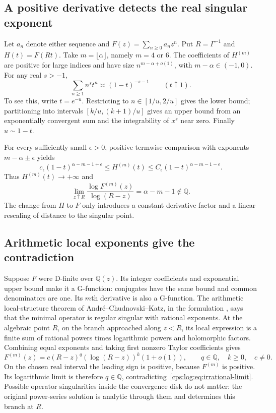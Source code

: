 \documentclass[11pt,letterpaper]{article}
\numberwithin{equation}{section}
\theoremstyle{remark}\newtheorem{remark}[theorem]{Remark}
\begin{document}
\subsection{A positive derivative detects the real singular exponent}
Let $a_n$ denote either sequence and
$F(z)=\sum_{n\ge0}a_nz^n$. Put $R=\Gamma^{-1}$ and $H(t)=F(Rt)$.
Take $m=\lfloor\alpha\rfloor$, namely $m=4$ or $6$. The coefficients
of $H^{(m)}$ are positive for large indices and have size
$n^{m-\alpha+o(1)}$, with $m-\alpha\in(-1,0)$.
For any real $s>-1$,
\begin{equation}\label{cps:log:eq:powersum}
 \sum_{n\ge1}n^st^n\asymp(1-t)^{-s-1}\qquad(t\uparrow1).
\end{equation}
To see this, write $t=e^{-u}$. Restricting to
$n\in[1/u,2/u]$ gives the lower bound; partitioning into intervals
$[k/u,(k+1)/u]$ gives an upper bound from an exponentially convergent
sum and the integrability of $x^s$ near zero. Finally $u\sim1-t$.

For every sufficiently small $\epsilon>0$, positive termwise
comparison with exponents $m-\alpha\pm\epsilon$ yields
\[
 c_\epsilon(1-t)^{\alpha-m-1+\epsilon}
 \le H^{(m)}(t)
 \le C_\epsilon(1-t)^{\alpha-m-1-\epsilon}.
\]
Thus $H^{(m)}(t)\to+\infty$ and
\begin{equation}\label{cps:log:eq:irrational-limit}
 \lim_{z\uparrow R}\frac{\log F^{(m)}(z)}{\log(R-z)}
 =\alpha-m-1\notin\mathbb Q.
\end{equation}
The change from $H$ to $F$ only introduces a constant derivative
factor and a linear rescaling of distance to the singular point.

\subsection{Arithmetic local exponents give the contradiction}
Suppose $F$ were D-finite over $\mathbb Q(z)$. Its integer coefficients and
exponential upper bound make it a G-function: conjugates have the
same bound and common denominators are one. Its $m$th derivative
is also a G-function. The arithmetic local-structure theorem of
Andr\'e--Chudnovski--Katz, in the formulation
\cite[Theorem 6 and Corollary 1, pp.\ 328--329]{FR}, says that the
minimal operator is regular singular with rational exponents.
At the algebraic point $R$, on the branch approached along $z<R$,
its local expression is a finite sum of rational powers times
logarithmic powers and holomorphic factors. Combining equal
exponents and taking first nonzero Taylor coefficients gives
\[
 F^{(m)}(z)=c(R-z)^q(\log(R-z))^k(1+o(1)),\qquad
 q\in\mathbb Q,\quad k\ge0,\quad c\ne0.
\]
On the chosen real interval the leading sign is positive, because
$F^{(m)}$ is positive. Its logarithmic limit is therefore $q\in\mathbb Q$,
contradicting~\eqref{cps:log:eq:irrational-limit}. Possible operator
singularities inside the convergence disk do not matter: the original
power-series solution is analytic through them and determines this
branch at $R$.
\end{document}
